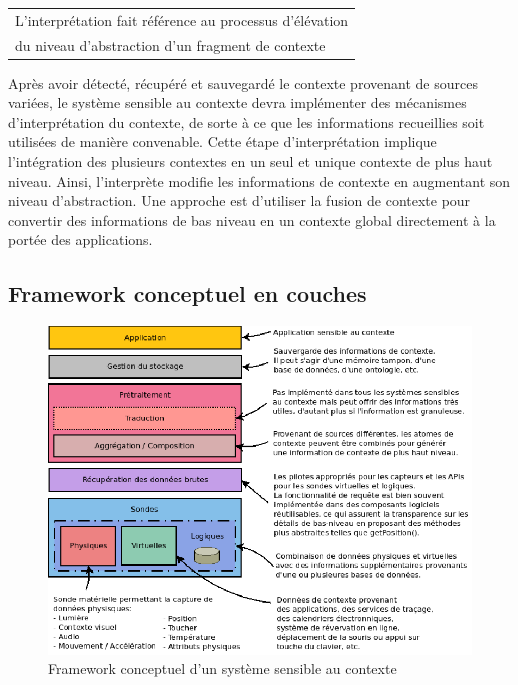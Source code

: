 {%
    \centering
    \begin{tabular}{l}
        L'interprétation fait référence au processus d'élévation \\
        du niveau d'abstraction d'un fragment de contexte
        \cite{dey_conceptual_2001} \\
    \end{tabular}
}%

Après avoir détecté, récupéré et sauvegardé le contexte provenant de sources
variées, le système sensible au contexte devra implémenter des mécanismes
d'interprétation du contexte, de sorte à ce que les informations recueillies
soit utilisées de manière convenable. Cette étape d'interprétation implique
l'intégration des plusieurs contextes en un seul et unique contexte de plus haut
niveau. Ainsi, l'interprète modifie les informations de contexte en augmentant
son niveau d'abstraction. Une approche est d'utiliser la fusion de contexte
pour convertir des informations de bas niveau en un contexte global directement
à la portée des applications.

\subsection{Framework conceptuel en couches}

\begin{figure}[H]
    \centering
    \includegraphics[width=.7\textwidth]{img/layered_conceptual_framework}
    \caption{Framework conceptuel d'un système sensible au contexte}
    \label{archi}
\end{figure}

